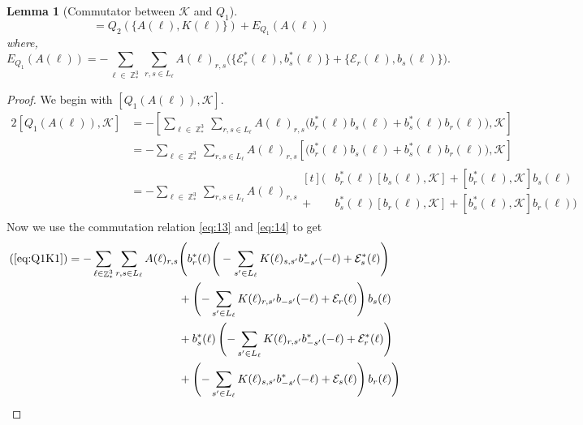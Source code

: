 \documentclass[sn-mathphys,Numbered, a4paper ,nocrop]{sn-jnl}%
\DeclareMathOperator{\Z}{\mathbb{Z}}
\theoremstyle{plain}
\newtheorem{lemma}[theorem]{Lemma}
\theoremstyle{definition}
\theoremstyle{remark}
\theoremstyle{plain}
\theoremstyle{definition}
\theoremstyle{remark}
\begin{document}
\begin{lemma}[Commutator between $\mathcal{K} $ and $Q_1$]\label{lem:Q1Kcomm}
    \begin{equation}
        [ Q_1(A(\ell)),\mathcal{K}] = Q_2(\{A(\ell),K(\ell)\}) + E_{Q_1}(A(\ell))
    \end{equation}
 where,
 \begin{equation}
     E_{Q_1}(A(\ell))=-\sum\limits_{\ell \in \Z^3_*}\sum\limits_{r,s \in L_{\ell}}A(\ell)_{r,s}\Big(\big\{\mathcal{E}^*_{r}(\ell),b^*_{s}(\ell)\big\} + \big\{\mathcal{E}_{r}(\ell),b_{s}(\ell)\big\}\Big). 
 \end{equation}
\end{lemma}
\begin{proof}We begin with $[ Q_1(A(\ell)),\mathcal{K}]$.
    \begin{alignat}{2}
        [ Q_1(A(\ell)),\mathcal{K}] &= -\left[\sum\limits_{\ell \in \Z^3_*}\sum\limits_{r,s \in L_{\ell}}A(\ell)_{r,s}\Big(b^*_{r}(\ell)b_{s}(\ell) + b^*_{s}(\ell)b_{r}(\ell)\Big),\mathcal{K}\right]\\
        &=-\sum\limits_{\ell \in \Z^3_*}\sum\limits_{r,s \in L_{\ell}}A(\ell)_{r,s}\left[\Big(b^*_{r}(\ell)b_{s}(\ell) + b^*_{s}(\ell)b_{r}(\ell)\Big),\mathcal{K}\right]\\
        &=-\sum\limits_{\ell \in \Z^3_*}\sum\limits_{r,s \in L_{\ell}}A(\ell)_{r,s}\begin{aligned}[t]
            \Big(&b^*_{r}(\ell)\left[b_{s}(\ell),\mathcal{K}\right] +\left[b^*_{r}(\ell),\mathcal{K}\right]b_{s}(\ell)\\ + &b^*_{s}(\ell)\left[b_{r}(\ell),\mathcal{K}\right]+ \left[b^*_{s}(\ell),\mathcal{K}\right]b_{r}(\ell)\Big)
        \end{aligned}\label{eq:Q1K1}
    \end{alignat}
    Now we use the commutation relation \eqref{eq:13} and \eqref{eq:14} to get
\begin{alignat}{2}
    (\ref{eq:Q1K1})&=-\sum\limits_{\ell \in \Z^3_*}\sum\limits_{r,s \in L_{\ell}}A(\ell)_{r,s}\begin{aligned}[t]
        &\Bigg(b^*_{r}(\ell)\Bigg(-\sum\limits_{s'\in L_{\ell}}K(\ell)_{s,s'}b^*_{-s'}(-\ell) + \mathcal{E}^*_{s}(\ell)\Bigg)\\ &+ \left(-\sum\limits_{s'\in L_{\ell}}K(\ell)_{r,s'}b_{-s'}(-\ell) + \mathcal{E}_{r}(\ell)\right)b_{s}(\ell)\\&+ b^*_{s}(\ell)\left(-\sum\limits_{s'\in L_{\ell}}K(\ell)_{r,s'}b^*_{-s'}(-\ell) + \mathcal{E}^*_{r}(\ell)\right)\\ &+ \left(-\sum\limits_{s'\in L_{\ell}}K(\ell)_{s,s'}b^*_{-s'}(-\ell) + \mathcal{E}_{s}(\ell)\right)b_{r}(\ell) \Bigg)        

\end{aligned}
\end{alignat}
\end{proof}
\end{document}
